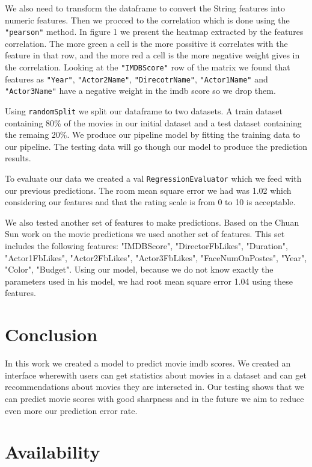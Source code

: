 \documentclass[letterpaper,twocolumn,10pt]{article}
\begin{document}
We also need to transform the dataframe to convert the String features into numeric features. Then we procced to the correlation which is done using the \texttt{"pearson"} method. In figure 1 we present the heatmap extracted by the features correlation. The more green a cell is the more possitive it correlates with the feature in that row, and the more red a cell is the more negative weight gives in the correlation. Looking at the \texttt{"IMDBScore"} row of the matrix we found that features as \texttt{"Year"}, \texttt{"Actor2Name"}, \texttt{"DirecotrName"}, \texttt{"Actor1Name"} and \texttt{"Actor3Name"} have a negative weight in the imdb score so we drop them.

Using \texttt{randomSplit} we split our dataframe to two datasets. A train dataset containing 80\% of the movies in our initial dataset and a test dataset containing the remaing 20\%. We produce our pipeline model by fitting the training data to our pipeline. The testing data will go though our model to produce the prediction results.\par 

To evaluate our data we created a val \texttt{RegressionEvaluator} which we feed with our previous predictions. The room mean square error we had was 1.02 which considering our features and that the rating scale is from 0 to 10 is acceptable.

We also tested another set of features to make predictions. Based on the Chuan Sun work on the movie predictions we used another set of features. This set includes the following features: "IMDBScore", "DirectorFbLikes", "Duration", "Actor1FbLikes", "Actor2FbLikes", "Actor3FbLikes", "FaceNumOnPostes", "Year", "Color", "Budget". Using our model, because we do not know exactly the parameters used in his model, we had root mean square error 1.04 using these features.  
\section{Conclusion}

In this work we created a model to predict movie imdb scores. We created an interface wherewith users can get statistics about movies in a dataset and can get recommendations about movies they are interseted in. Our testing shows that we can predict movie scores with good sharpness and in the future we aim to reduce even more our prediction error rate.  

\section{Availability}
\end{document}
